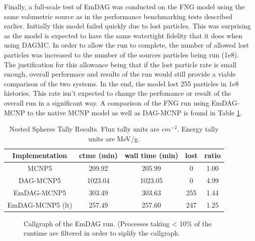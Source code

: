 \documentclass[10pt, a4paper]{article}
\begin{document}
Finally, a full-scale test of EmDAG was conducted on the FNG model using the same volumetric source as in the performance benchmarking tests described earlier. Initially this model failed quickly due to lost particles. This was surprising as the model is expected to have the same watertight fidelity that it does when using DAGMC. In order to allow the run to complete, the number of allowed lost particles was increased to the number of the sources particles being run (1e8). The justification for this allowance being that if the lost particle rate is small enough, overall performace and results of the run would still provide a viable comparison of the two systems. In the end, the model lost 255 particles in 1e8 histories. This rate isn't expected to change the perfomance or result of the overall run in a significant way. A comparison of the FNG run using EmDAG-MCNP to the native MCNP model as well as DAG-MCNP is found in Table \ref{fngemdag}.


\begin{table}[H]
  \small
  \begin{center}
    \caption{Nested Spheres Tally Results. Flux tally units are $cm^{-2}$. Energy tally units are MeV/g.}
    \label{fngemdag}
        \begin{tabular}{|c|c|c|c|c|}
      \hline
      \textbf{Implementation} & \textbf{ctme (min)} & \textbf{wall time (min)} & \textbf{lost} & \textbf{ratio} \\
      \hline
      MCNP5 & 209.92 & 205.99 & 0 & 1.00 \\
      \hline
      DAG-MCNP5 & 1023.04 & 1023.05 & 0 & 4.99 \\
      \hline
      EmDAG-MCNP5 & 303.49 & 303.63 & 255 & 1.44 \\
      \hline
      EmDAG-MCNP5 (lt) & 257.49 & 257.60 & 247 & 1.25 \\
      \hline
    \end{tabular} 

  \end{center}
\end{table}


\begin{figure}
  \centering
  \caption{Callgraph of the EmDAG run. (Processes taking < 10\% of the runtime are filtered in order to siplify the callgraph.}
  \label{emdag-fng-coarse}
  
  
\end{figure}
\end{document}
